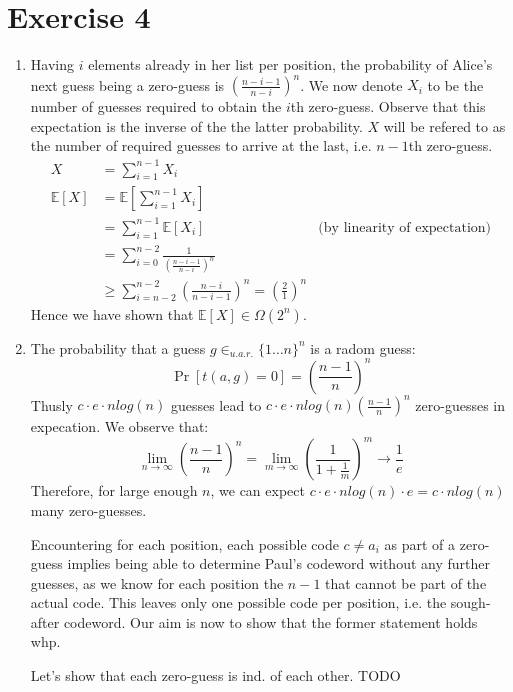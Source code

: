 \documentclass[a4paper,german]{article}
\begin{document}
\section*{Exercise 4}
\begin{enumerate}
\item
Having \(i\) elements already in her list per position, the probability of Alice's next guess being a zero-guess is \((\frac{n-i-1}{n-i})^n\). We now denote \(X_i \) to be the number of guesses required to obtain the \(i\)th zero-guess. Observe that this expectation is the inverse of the the latter probability. \(X\) will be refered to as the number of required guesses to arrive at the last, i.e. \(n-1\)th zero-guess.
\begin{align*}
X &= \sum_{i=1}^{n-1} X_i \\
\mathbb{E}[X] &= \mathbb{E}[\sum_{i=1}^{n-1} X_i ]\\
&= \sum_{i=1}^{n-1} \mathbb{E}[X_i] & \text{(by linearity of expectation)} \\
&= \sum_{i=0}^{n-2}\frac{1}{ (\frac{n-i-1}{n-i})^n}\\
&\geq \sum_{i=n-2}^{n-2} (\frac{n-i}{n-i-1})^n = (\frac{2}{1})^n
\end{align*}
Hence we have shown that \( \mathbb{E}[X] \in \Omega(2^n) \).
\item
The probability that a guess \(g \in_{u.a.r.} \{1 \dots  n\}^n\) is a radom guess:
$$ \Pr[t(a,g) = 0] = (\frac{n-1}{n})^n $$
Thusly \(c\cdot e \cdot nlog(n)\) guesses lead to \(c\cdot e \cdot nlog(n)  (\frac{n-1}{n})^n \) zero-guesses in expecation. We observe that:
$$ \lim_{n \to \infty}  (\frac{n-1}{n})^n =  \lim_{m \to \infty}  (\frac{1}{1 + \frac{1}{m}})^m \to \frac{1}{e}$$
Therefore, for large enough \(n\), we can expect  \(c\cdot e \cdot nlog(n)  \cdot e  = c \cdot nlog(n)\) many zero-guesses.

Encountering for each position, each possible code \(c \neq a_i\) as part of a zero-guess implies being able to determine Paul's codeword without any further guesses, as we know for each position the \(n-1\) that cannot be part of the actual code. This leaves only one possible code per position, i.e. the sough-after codeword. Our aim is now to show that the former statement holds whp.

Let's show that each zero-guess is ind. of each other.
TODO


\end{enumerate}
\end{document}
